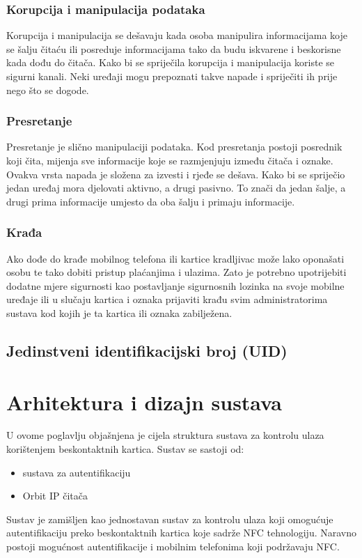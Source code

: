 \documentclass[times, utf8, zavrsni]{fer}
\begin{document}
\subsection{Korupcija i manipulacija podataka}
Korupcija i manipulacija se dešavaju kada osoba manipulira informacijama koje se šalju čitaću ili posreduje informacijama tako da budu iskvarene i beskorisne kada dođu do čitača. Kako bi se spriječila korupcija i manipulacija koriste se sigurni kanali. Neki uređaji mogu prepoznati takve napade i spriječiti ih prije nego što se dogode.
\subsection{Presretanje}
Presretanje je slično manipulaciji podataka. Kod presretanja postoji posrednik koji čita, mijenja sve informacije koje se razmjenjuju između čitača i oznake. Ovakva vrsta napada je složena za izvesti i rjeđe se dešava. Kako bi se spriječio jedan uređaj mora djelovati aktivno, a drugi pasivno. To znači da jedan šalje, a drugi prima informacije umjesto da oba šalju i primaju informacije.
\subsection{Krađa}
Ako dođe do krađe mobilnog telefona ili kartice kradljivac može lako oponašati osobu te tako dobiti pristup plaćanjima i ulazima. Zato je potrebno upotrijebiti dodatne mjere sigurnosti kao postavljanje sigurnosnih lozinka na svoje mobilne uređaje ili u slučaju kartica i oznaka prijaviti krađu svim administratorima sustava kod kojih je ta kartica ili oznaka zabilježena.

\section{Jedinstveni identifikacijski broj (UID)}


\chapter{Arhitektura i dizajn sustava}
U ovome poglavlju objašnjena je cijela struktura sustava za kontrolu ulaza korištenjem beskontaktnih kartica. Sustav se sastoji od:
\begin{itemize}
\item sustava za autentifikaciju
\item Orbit IP čitača
\end{itemize}

Sustav je zamišljen kao jednostavan sustav za kontrolu ulaza koji omogućuje autentifikaciju preko beskontaktnih kartica koje sadrže NFC tehnologiju. Naravno postoji mogućnost autentifikacije i mobilnim telefonima koji podržavaju NFC. \par 
\end{document}
